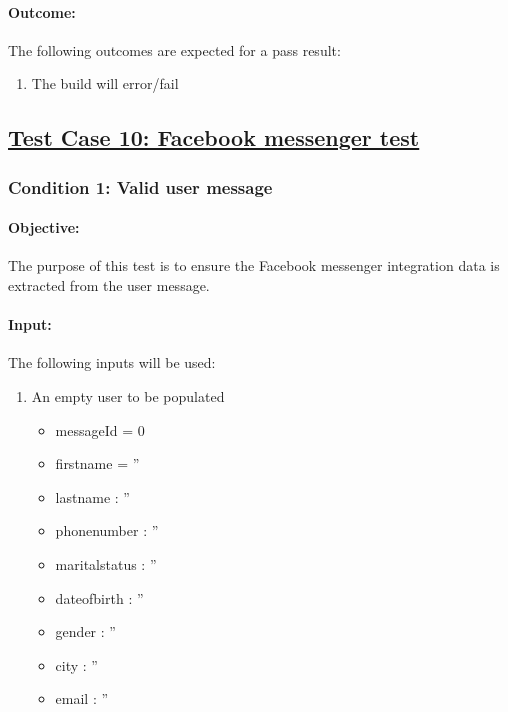 \documentclass{article}
\begin{document}
\paragraph{Outcome:} The following outcomes are expected for a pass result:
\begin{enumerate}
	\item The build will error/fail
\end{enumerate}


\subsection{\underline{Test Case 10: Facebook messenger test}}\label{test10}
\subsubsection{Condition 1: Valid user message}
\paragraph{Objective:} The purpose of this test is to ensure the Facebook messenger integration data is extracted from the user message.
\paragraph{Input:} The following inputs will be used:
\begin{enumerate}
	\item An empty user to be populated
	\begin{itemize}
  	\item messageId = 0
    \item firstname = ''
    \item lastname : ''
    \item phonenumber : ''
    \item maritalstatus : ''
    \item dateofbirth : ''
    \item gender : ''
    \item city : ''
    \item email : ''
    \end{itemize}	  
\end{enumerate}
\end{document}
